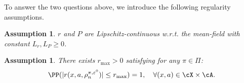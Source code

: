 \documentclass{article}
\theoremstyle{plain}
\newtheorem{assumption}[theorem]{Assumption}
\begin{document}
To answer the two questions above, we introduce the following regularity assumptions.

\begin{assumption}
    \label{assumption:Lipschitz}
    $r$ and $P$ are Lipschitz-continuous w.r.t. the mean-field with constant $L_r, L_P \ge 0$. 
\end{assumption}

\begin{assumption}
    \label{assumption:rmax}
    There exists $r_{\max} > 0$ satisfying for any $\pi \in \Pi$:
    \begin{equation*}
        \PP(|r(x, a, \rho^{\pi, \varepsilon^0}_n)| \leq r_{\max}) = 1, \quad\forall (x, a) \in \cX \times \cA.
    \end{equation*}
\end{assumption}
\end{document}
